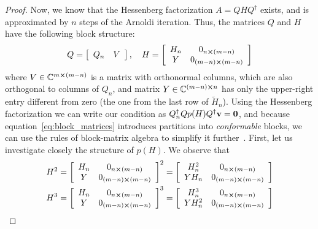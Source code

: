 \begin{proof}
	Now, we know that the Hessenberg factorization \(A = QHQ^{\dagger}\) exists, and is approximated by \(n\) steps
	of the Arnoldi iteration. Thus, the matrices \(Q\) and \(H\) have the following block structure:
	\begin{equation*}
		Q=\left[\begin{array}{ll}
				Q_n & V
			\end{array}\right],
		\quad H=\left[\begin{array}{cc}
				H_n & 0_{n\cross(m-n)}     \\
				Y   & 0_{(m-n)\cross(m-n)}
			\end{array}\right]
		\label{eq:block_matrices}
	\end{equation*}
	where \(V \in \mathbb{C}^{m\cross(m-n)}\) is a matrix with orthonormal columns, which are also orthogonal to columns of
	\(Q_n\), and matrix \(Y\in\mathbb{C}^{(m-n)\cross n}\) has only the upper-right entry different from zero
	(the one from the last row of \(\tilde{H}_n\)). Using the Hessenberg factorization we can write our condition
	as \(Q_n^{\dagger} Q p(H) Q^{\dagger}\vectorbold{v} = \vectorbold{0}\), and because equation~\eqref{eq:block_matrices}
	introduces partitions into \textit{conformable} blocks, we can use the rules of block-matrix algebra to simplify
	it further~\autocite{Eves1980}.
	First, let us investigate closely the structure of \(p(H)\). We observe that
	\begin{align*}
		H^2 & = \left[\begin{array}{cc}
				              H_n & 0_{n\cross(m-n)}     \\
				              Y   & 0_{(m-n)\cross(m-n)}
			              \end{array}\right]^2 =
		\left[\begin{array}{cc}
				      H_n^2 & 0_{n\cross(m-n)}     \\
				      Y H_n & 0_{(m-n)\cross(m-n)}
			      \end{array}\right]          \\
		H^3 & =
		\left[\begin{array}{cc}
				      H_n & 0_{n\cross(m-n)}     \\
				      Y   & 0_{(m-n)\cross(m-n)}
			      \end{array}\right]^3 =
		\left[\begin{array}{cc}
				      H_n^3   & 0_{n\cross(m-n)}     \\
				      Y H_n^2 & 0_{(m-n)\cross(m-n)}
			      \end{array}\right]        \\

\end{align*}
\end{proof}
